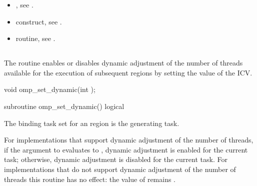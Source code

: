 \crossreferences
\begin{itemize}
\item {}, see 
.

\item {} construct, see 
.

\item {} routine, see 
.
\end{itemize}








\bigskip
\subsection{}
\label{subsec:omp_set_dynamic}
\summary
The  routine enables or disables dynamic adjustment of the 
number of threads available for the execution of subsequent  regions by 
setting the value of the  ICV.


\pagebreak
\format
\ccppspecificstart
\begin{boxedcode}
void omp\_set\_dynamic(int );
\end{boxedcode}
\ccppspecificend
\bigskip

\begin{samepage}
\fortranspecificstart
\begin{boxedcode}
subroutine omp\_set\_dynamic()
logical 
\end{boxedcode}
\fortranspecificend
\end{samepage}

\binding
The binding task set for an  region is the generating task. 

\effect
For implementations that support dynamic adjustment of the number of threads, if the 
argument to  evaluates to , dynamic adjustment is enabled for 
the current task; otherwise, dynamic adjustment is disabled for the current task. For 
implementations that do not support dynamic adjustment of the number of threads this 
routine has no effect: the value of  remains .

